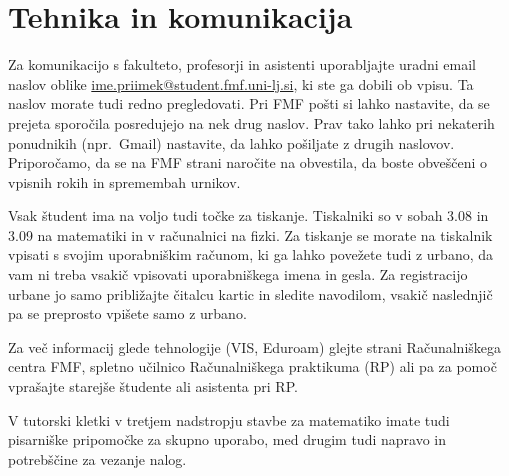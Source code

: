 \documentclass[a4paper,notumble]{leaflet} %
\begin{document}
  \vspace{-2ex}
  \section{Tehnika in komunikacija}
  \vspace{-1ex}
  Za komunikacijo s fakulteto, profesorji in asistenti uporabljajte uradni email naslov oblike
  \url{ime.priimek@student.fmf.uni-lj.si}, ki ste ga dobili ob vpisu. Ta naslov morate tudi redno pregledovati. Pri FMF pošti si lahko nastavite, da se prejeta sporočila posredujejo na nek drug naslov. Prav tako lahko pri nekaterih ponudnikih (npr.\ Gmail) nastavite, da lahko pošiljate z drugih naslovov.
  Priporočamo, da se na FMF strani naročite na obvestila, da boste obveščeni o vpisnih rokih in spremembah urnikov.
  
  Vsak študent ima na voljo tudi točke za tiskanje. Tiskalniki so v sobah 3.08 in 3.09 na matematiki in v računalnici na fizki. Za tiskanje se morate na tiskalnik vpisati s svojim uporabniškim računom, ki ga lahko povežete tudi z urbano, da vam ni treba vsakič vpisovati uporabniškega imena in gesla.  Za registracijo urbane jo samo približajte čitalcu kartic in sledite navodilom, vsakič naslednjič pa se preprosto vpišete samo z urbano.
  
  Za več informacij glede tehnologije (VIS, Eduroam) glejte strani Računalniškega centra FMF, spletno učilnico Računalniškega praktikuma (RP) ali pa za pomoč vprašajte starejše študente ali asistenta pri RP.
  
  V tutorski kletki v tretjem nadstropju stavbe za matematiko imate tudi pisarniške pripomočke za skupno uporabo, med drugim tudi napravo in potrebščine za vezanje nalog.
  
  
\end{document}
